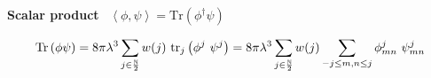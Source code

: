 \documentclass[9pt]{beamer}
\newcommand{\sm}[1]{\left\langle#1\right\rangle}
\begin{document}
\begin{frame}
\vspace*{8pt}

\textbf{Scalar product} \ $\sm{\phi , \psi} = \mbox{Tr}\left( \phi^\dagger \psi \right)$

\begin{eqnarray*}
\mbox{Tr}\left( \phi \psi \right) = 8 \pi \lambda^3 \sum_{j\in\frac{\mathbb{N}}{2}} w(j) \ \mbox{tr}_j\left(\phi^j \ \psi^j\right) = 8 \pi \lambda^3 \sum_{j\in\frac{\mathbb{N}}{2}} w(j) \sum_{-j \leq m, n \leq j} \phi^j_{mn} \ \psi^j_{mn}
\vspace*{-5pt}
\end{eqnarray*}

\vfill

\end{frame}

\end{document}
